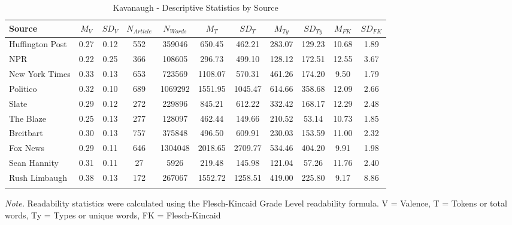 \documentclass[
  man,floatsintext]{apa6}
\begin{document}
\begin{table}[h]

\begin{center}
\begin{threeparttable}

\caption{\label{tab:exp2-source-descriptives-kav}Kavanaugh - Descriptive Statistics by Source}

\footnotesize{

\begin{tabular}{lcccccccccc}
\toprule
Source & $M_V$ & $SD_V$ & $N_{Article}$ & $N_{Words}$ & $M_T$ & $SD_T$ & $M_{Ty}$ & $SD_{Ty}$ & $M_{FK}$ & $SD_{FK}$\\
\midrule
Huffington Post & 0.27 & 0.12 & 552 & 359046 & 650.45 & 462.21 & 283.07 & 129.23 & 10.68 & 1.89\\
NPR & 0.22 & 0.25 & 366 & 108605 & 296.73 & 499.10 & 128.12 & 172.51 & 12.55 & 3.67\\
New York Times & 0.33 & 0.13 & 653 & 723569 & 1108.07 & 570.31 & 461.26 & 174.20 & 9.50 & 1.79\\
Politico & 0.32 & 0.10 & 689 & 1069292 & 1551.95 & 1045.47 & 614.66 & 358.68 & 12.09 & 2.66\\
Slate & 0.29 & 0.12 & 272 & 229896 & 845.21 & 612.22 & 332.42 & 168.17 & 12.29 & 2.48\\
The Blaze & 0.25 & 0.13 & 277 & 128097 & 462.44 & 149.66 & 210.52 & 53.14 & 10.73 & 1.85\\
Breitbart & 0.30 & 0.13 & 757 & 375848 & 496.50 & 609.91 & 230.03 & 153.59 & 11.00 & 2.32\\
Fox News & 0.29 & 0.11 & 646 & 1304048 & 2018.65 & 2709.77 & 534.46 & 404.20 & 9.91 & 1.98\\
Sean Hannity & 0.31 & 0.11 & 27 & 5926 & 219.48 & 145.98 & 121.04 & 57.26 & 11.76 & 2.40\\
Rush Limbaugh & 0.38 & 0.13 & 172 & 267067 & 1552.72 & 1258.51 & 419.00 & 225.80 & 9.17 & 8.86\\
\bottomrule
\addlinespace
\end{tabular}

}

\begin{tablenotes}[para]
\normalsize{\textit{Note.} Readability statistics were calculated using the Flesch-Kincaid Grade Level readability formula. V = Valence, T = Tokens or total words, Ty = Types or unique words, FK = Flesch-Kincaid}
\end{tablenotes}

\end{threeparttable}
\end{center}

\end{table}
\end{document}
